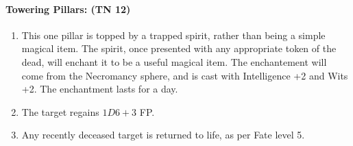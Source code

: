 \begin{multicols}{2}
\columnbreak

\paragraph{Towering Pillars: (TN 12)}

\begin{enumerate}

	\item{This one pillar is topped by a trapped spirit, rather than being a simple magical item.  The spirit, once presented with any appropriate token of the dead, will enchant it to be a useful magical item.  The enchantement will come from the Necromancy sphere, and is cast with Intelligence +2 and Wits +2.  The enchantment lasts for a day.}
	\item{The target regains $1D6+3$ FP.}
	\item{Any recently deceased target is returned to life, as per Fate level 5.}

\end{enumerate}

\end{multicols}

